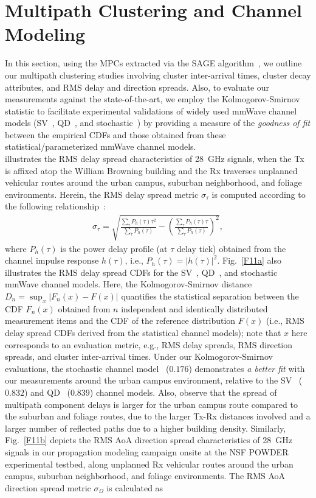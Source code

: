 \documentclass[10pt, twocolumn]{IEEEtran}
\begin{document}
{\section{Multipath Clustering and Channel Modeling}\label{S5}
In this section, using the MPCs extracted via the SAGE algorithm~\cite{SAGE}, we outline our multipath clustering studies involving cluster inter-arrival times, cluster decay attributes, and RMS delay and direction spreads. Also, to evaluate our measurements against the state-of-the-art, we employ the Kolmogorov-Smirnov statistic to facilitate experimental validations of widely used mmWave channel models (SV~\cite{SV_Molisch}, QD~\cite{QDC_NIST}, and stochastic~\cite{Indoor60G}) by providing a measure of the \emph{goodness of fit} between the empirical CDFs and those obtained from these statistical/parameterized mmWave channel models.\\
 illustrates the RMS delay spread characteristics of \SI{28}{\giga\hertz} signals, when the Tx is affixed atop the William Browning building and the Rx traverses unplanned vehicular routes around the urban campus, suburban neighborhood, and foliage environments. Herein, the RMS delay spread metric $\sigma_{\tau}$ is computed according to the following relationship~\cite{Indoor60G}:
\vspace{1.8mm}
\begin{align}\label{RMS_DS}
    \sigma_{\tau} = \sqrt{\frac{\sum_{\tau}P_{h}(\tau)\tau^{2}}{\sum_{\tau}P_{h}(\tau)} - \left(\frac{\sum_{\tau}P_{h}(\tau)\tau}{\sum_{\tau}P_{h}(\tau)}\right)^{2}},
\end{align}
where $P_{h}(\tau)$ is the power delay profile (at $\tau$ delay tick) obtained from the channel impulse response $h(\tau)$, i.e., $P_{h}(\tau){=}|h(\tau)|^{2}$. Fig.~\ref{F11a} also illustrates the RMS delay spread CDFs for the SV~\cite{SV_Molisch}, QD~\cite{QDC_NIST}, and stochastic~\cite{Indoor60G} mmWave channel models. Here, the Kolmogorov-Smirnov distance $D_{n}{=}\sup_{x}|F_{n}(x){-}F(x)|$ quantifies the statistical separation between the CDF $F_{n}(x)$ obtained from $n$ independent and identically distributed measurement items and the CDF of the reference distribution $F(x)$ (i.e., RMS delay spread CDFs derived from the statistical channel models); note that $x$ here corresponds to an evaluation metric, e.g., RMS delay spreads, RMS direction spreads, and cluster inter-arrival times. Under our Kolmogorov-Smirnov evaluations, the stochastic channel model~\cite{Indoor60G} ($0.176$) demonstrates \emph{a better fit} with our measurements around the urban campus environment, relative to the SV~\cite{SV_Molisch} ($0.832$) and QD~\cite{QDC_NIST} ($0.839$) channel models. Also, observe that the spread of multipath component delays is larger for the urban campus route compared to the suburban and foliage routes, due to the larger Tx-Rx distances involved and a larger number of reflected paths due to a higher building density. Similarly, Fig.~\ref{F11b} depicts the RMS AoA direction spread characteristics of \SI{28}{\giga\hertz} signals in our propagation modeling campaign onsite at the NSF POWDER experimental testbed, along unplanned Rx vehicular routes around the urban campus, suburban neighborhood, and foliage environments. The RMS AoA direction spread metric $\sigma_{\Omega}$ is calculated as~\cite{Indoor60G}
}
\end{document}
